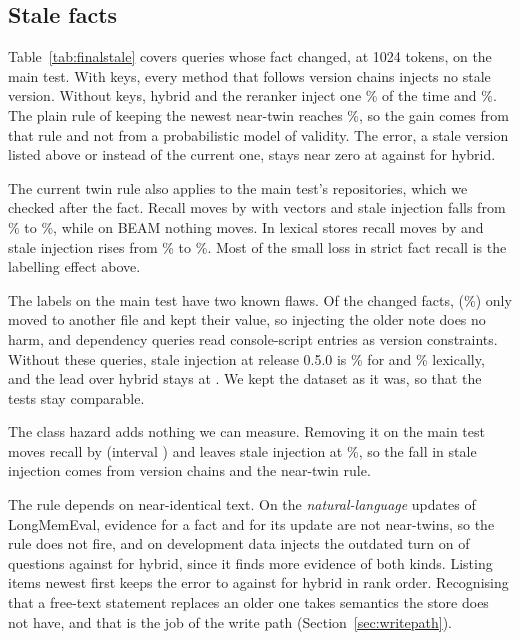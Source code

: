 \subsection{Stale facts}\label{sec:stale}
Table~\ref{tab:finalstale} covers queries whose fact changed, at 1024 tokens, on the main test. With keys, every method that follows version chains injects no stale version. Without keys, hybrid and the reranker inject one \% of the time and \kanerva {}\%. The plain rule of keeping the newest near-twin reaches \%, so the gain comes from that rule and not from a probabilistic model of validity. The error, a stale version listed above or instead of the current one, stays near zero at  against  for hybrid.

The current twin rule also applies to the main test's repositories, which we checked after the fact. Recall moves by  with vectors and stale injection falls from \% to \%, while on BEAM nothing moves. In lexical stores recall moves by  and stale injection rises from \% to \%. Most of the small loss in strict fact recall is the labelling effect above.

The labels on the main test have two known flaws. Of the  changed facts,  (\%) only moved to another file and kept their value, so injecting the older note does no harm, and  dependency queries read console-script entries as version constraints. Without these queries, stale injection at release 0.5.0 is \% for \kanerva and \% lexically, and the lead over hybrid stays at . We kept the dataset as it was, so that the tests stay comparable.

The class hazard adds nothing we can measure. Removing it on the main test moves recall by  (interval ) and leaves stale injection at \%, so the fall in stale injection comes from version chains and the near-twin rule.

The rule depends on near-identical text. On the \emph{natural-language} updates of LongMemEval, evidence for a fact and for its update are not near-twins, so the rule does not fire, and on development data \kanerva injects the outdated turn on  of questions against  for hybrid, since it finds more evidence of both kinds. Listing items newest first keeps the error to  against  for hybrid in rank order. Recognising that a free-text statement replaces an older one takes semantics the store does not have, and that is the job of the write path (Section~\ref{sec:writepath}).

